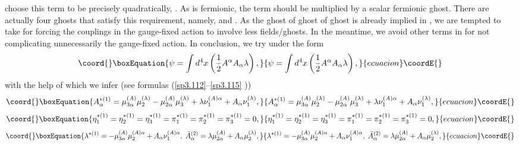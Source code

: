 \documentclass[a4paper,12pt]{article}
\begin{document}
choose this term to be precisely quadratically, \coordHE{}. As \myHighlight{$\psi $}\coordHE{} is fermionic, the term \coordHE{}
should be multiplied by a scalar fermionic ghost. There are actually four
ghosts that satisfy this requirement, namely, \coordHE{} and \myHighlight{$\lambda $}\coordHE{}. As the ghost of ghost of ghost \myHighlight{$\lambda $}\coordHE{} is
already implied in \coordHE{}, we are
tempted to take \coordHE{} for forcing the
couplings in the gauge-fixed action to involve less fields/ghosts. In the
meantime, we avoid other terms in \myHighlight{$\psi $}\coordHE{} for not complicating unnecessarily
the gauge-fixed action. In conclusion, we try \myHighlight{$\psi $}\coordHE{} under the form 
\begin{equation}\coord{}\boxEquation{
\psi =\int d^{4}x\left( \frac{1}{2}A^{\alpha }A_{\alpha }\lambda \right) ,
\label{sp3.e27}
}{
\psi =\int d^{4}x\left( \frac{1}{2}A^{\alpha }A_{\alpha }\lambda \right) ,
}{ecuacion}\coordE{}\end{equation}
with the help of which we infer (see formulas (\ref{sp3.112}--\ref{sp3.115}%
)) 
\begin{equation}\coord{}\boxEquation{
A_{\alpha }^{*(1)}=\mu _{3\alpha }^{(A)}\mu _{2}^{(\lambda )}-\mu _{2\alpha
}^{(A)}\mu _{3}^{(\lambda )}+\lambda \nu _{1}^{(A)\alpha }+A_{\alpha }\nu
_{1}^{(\lambda )},  \label{sp3.e28}
}{
A_{\alpha }^{*(1)}=\mu _{3\alpha }^{(A)}\mu _{2}^{(\lambda )}-\mu _{2\alpha
}^{(A)}\mu _{3}^{(\lambda )}+\lambda \nu _{1}^{(A)\alpha }+A_{\alpha }\nu
_{1}^{(\lambda )},  }{ecuacion}\coordE{}\end{equation}
\begin{equation}\coord{}\boxEquation{
\eta _{1}^{*(1)}=\eta _{2}^{*(1)}=\eta _{3}^{*(1)}=\pi _{1}^{*(1)}=\pi
_{2}^{*(1)}=\pi _{3}^{*(1)}=0,  \label{sp3.e29}
}{
\eta _{1}^{*(1)}=\eta _{2}^{*(1)}=\eta _{3}^{*(1)}=\pi _{1}^{*(1)}=\pi
_{2}^{*(1)}=\pi _{3}^{*(1)}=0,  }{ecuacion}\coordE{}\end{equation}
\begin{equation}\coord{}\boxEquation{
\lambda ^{*(1)}=-\mu _{3\alpha }^{(A)}\mu _{2}^{(A)\alpha }+A_{\alpha }\nu
_{1}^{(A)\alpha },\;\bar{A}_{\alpha }^{(2)}=\lambda \mu _{2\alpha
}^{(A)}+A_{\alpha }\mu _{2}^{(\lambda )},  \label{sp3.e30}
}{
\lambda ^{*(1)}=-\mu _{3\alpha }^{(A)}\mu _{2}^{(A)\alpha }+A_{\alpha }\nu
_{1}^{(A)\alpha },\;\bar{A}_{\alpha }^{(2)}=\lambda \mu _{2\alpha
}^{(A)}+A_{\alpha }\mu _{2}^{(\lambda )},  }{ecuacion}\coordE{}\end{equation}
\end{document}
